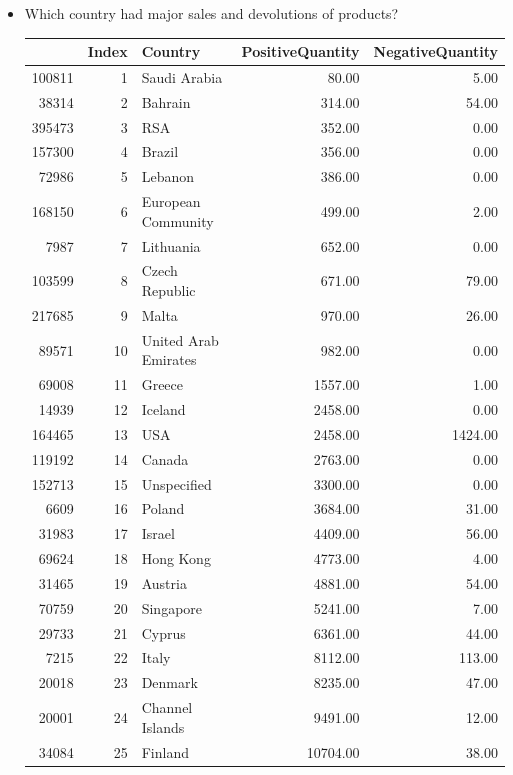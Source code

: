 \documentclass[conference]{IEEEtran}\usepackage[]{graphicx}\usepackage[]{color}
\begin{document}
\begin{itemize}
   
   \item Which country had major sales and devolutions of products?
\begin{table}[ht]
\centering
\begin{tabular}{rrlrr}
  \hline
 & Index & Country & PositiveQuantity & NegativeQuantity \\ 
  \hline
100811 &   1 & Saudi Arabia & 80.00 & 5.00 \\ 
  38314 &   2 & Bahrain & 314.00 & 54.00 \\ 
  395473 &   3 & RSA & 352.00 & 0.00 \\ 
  157300 &   4 & Brazil & 356.00 & 0.00 \\ 
  72986 &   5 & Lebanon & 386.00 & 0.00 \\ 
  168150 &   6 & European Community & 499.00 & 2.00 \\ 
  7987 &   7 & Lithuania & 652.00 & 0.00 \\ 
  103599 &   8 & Czech Republic & 671.00 & 79.00 \\ 
  217685 &   9 & Malta & 970.00 & 26.00 \\ 
  89571 &  10 & United Arab Emirates & 982.00 & 0.00 \\ 
  69008 &  11 & Greece & 1557.00 & 1.00 \\ 
  14939 &  12 & Iceland & 2458.00 & 0.00 \\ 
  164465 &  13 & USA & 2458.00 & 1424.00 \\ 
  119192 &  14 & Canada & 2763.00 & 0.00 \\ 
  152713 &  15 & Unspecified & 3300.00 & 0.00 \\ 
  6609 &  16 & Poland & 3684.00 & 31.00 \\ 
  31983 &  17 & Israel & 4409.00 & 56.00 \\ 
  69624 &  18 & Hong Kong & 4773.00 & 4.00 \\ 
  31465 &  19 & Austria & 4881.00 & 54.00 \\ 
  70759 &  20 & Singapore & 5241.00 & 7.00 \\ 
  29733 &  21 & Cyprus & 6361.00 & 44.00 \\ 
  7215 &  22 & Italy & 8112.00 & 113.00 \\ 
  20018 &  23 & Denmark & 8235.00 & 47.00 \\ 
  20001 &  24 & Channel Islands & 9491.00 & 12.00 \\ 
  34084 &  25 & Finland & 10704.00 & 38.00 \\ 

\end{tabular}
\end{table}
\end{itemize}
\end{document}

